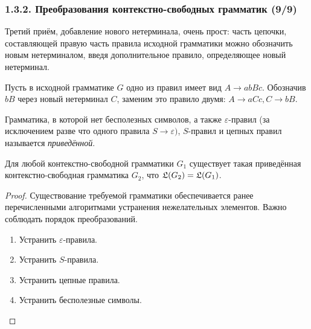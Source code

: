\documentclass[mathserif,12pt,aspectratio=169]{beamer}
\renewcommand{\index}[1]{}
\def\odmkey#1#2{{\it\color{red} #1}\index{#2}}
\begin{document}
\begin{frame}
\frametitle{1.3.2. Преобразования контекстно-свободных грамматик (9/9)}
 
Третий приём, добавление нового нетерминала, очень прост: 
часть цепочки, составляющей правую  часть  правила  исходной грамматики можно обозначить новым нетерминалом, введя дополнительное правило, определяющее  новый  нетерминал.

\begin{example} Пусть в исходной грамматике $G$ одно из  правил  имеет вид $A \rightarrow abBc$.  Обозначив $bB$ через новый  нетерминал  $C$,  заменим это правило двумя:  $A \rightarrow aCc, C \rightarrow bB$.
\end{example}


Грамматика, в которой нет бесполезных символов,
а также $\varepsilon$-правил
(за исключением разве что одного правила 
$S\to\varepsilon)$, $S$-правил и цепных правил 
называется
\odmkey{приведённой}{Грамматика!приведённая}.

\begin{theorem}
Для любой контекстно-свободной грамматики $G_1$
существует такая приведённая контекстно-свободная грамматика $G_2$,
что  $\frak{L}(G_2)=\frak{L}(G_1)$.
\end{theorem}

\begin{proof}
Существование требуемой грамматики
обеспечивается ранее перечисленными алгоритмами
устранения нежелательных элементов.
Важно соблюдать порядок преобразований. 
\begin{enumerate}
\item Устранить $\varepsilon$-правила.
\item Устранить $S$-правила.
\item Устранить цепные правила.
\item Устранить бесполезные символы. 
\end{enumerate}
\end{proof}


\end{frame}
\end{document}
